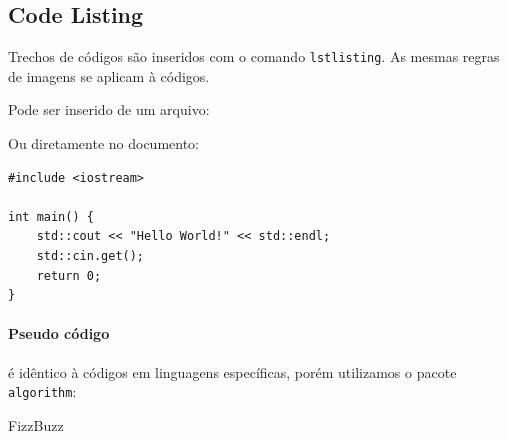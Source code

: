 \documentclass[10pt, a4paper]{article}
\begin{document}
	\subsection{Code Listing}
    Trechos de códigos são inseridos com o comando \texttt{lstlisting}. As mesmas regras de imagens se aplicam à códigos.

    Pode ser inserido de um arquivo:

    

    Ou diretamente no documento:
    
\begin{lstlisting}[caption = Hello World! in c++]
#include <iostream>

int main() {
    std::cout << "Hello World!" << std::endl;
    std::cin.get();
    return 0;
}
\end{lstlisting}
    
\paragraph{Pseudo código} é idêntico à códigos em linguagens específicas, porém utilizamos o pacote \texttt{algorithm}:

\begin{algorithm}[!htb]
\caption{FizzBuzz}
\end{algorithm}
	


		
\end{document}
